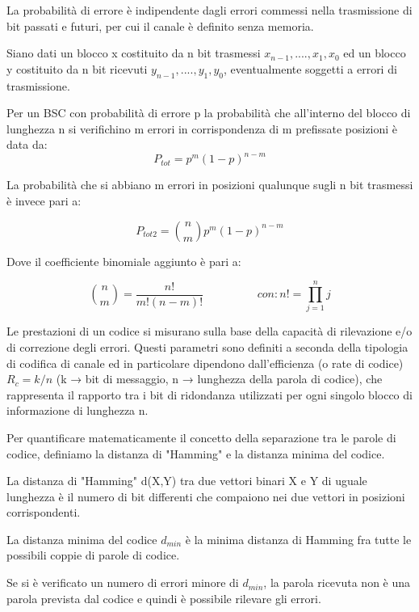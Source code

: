 \documentclass[LaM,binding=0.6cm,oneside]{../sapthesis}
\begin{document}
La probabilità di errore è indipendente dagli errori commessi nella trasmissione di bit passati e futuri, per cui il canale è definito senza memoria.

Siano dati un blocco x costituito da n bit trasmessi $x_{n-1},....,x_1,x_0$ ed un blocco y costituito da n bit ricevuti $y_{n-1},....,y_1,y_0$, eventualmente soggetti a errori di trasmissione.

Per un BSC con probabilità di errore p la probabilità che all'interno del blocco di lunghezza n si verifichino m errori in corrispondenza di m prefissate posizioni è data da:
\begin{equation}
    P_{tot} = p^{m} (1-p)^{n-m}
\end{equation}

La probabilità che si abbiano m errori in posizioni qualunque sugli n bit trasmessi  è invece pari a:

\begin{equation}
    P_{tot2} = \binom{n}{m} p^{m} (1-p)^{n-m}
\end{equation}

Dove il coefficiente binomiale aggiunto è pari a:

\begin{equation}
    \binom{n}{m} = \frac{n!}{m! (n-m)!}  \hspace{2cm} con: n! = \prod_{j=1}^{n}j
\end{equation}


Le  prestazioni  di  un  codice  si  misurano  sulla  base  della
capacità di rilevazione e/o di correzione degli errori. Questi parametri sono definiti a seconda della tipologia di codifica di canale ed in particolare dipendono dall’efficienza (o rate di codice) $R_c=k/n$ (k → bit di messaggio, n → lunghezza
della parola di codice), che rappresenta il rapporto tra i bit di ridondanza utilizzati per ogni singolo blocco di informazione di lunghezza n.

Per  quantificare  matematicamente  il  concetto  della  separazione
tra  le  parole  di  codice,  definiamo  la  distanza  di  "Hamming"  e  la distanza minima del codice.

La distanza  di  "Hamming" d(X,Y)  tra  due  vettori  binari  X  e  Y  di
uguale  lunghezza  è  il  numero  di  bit  differenti  che  compaiono  nei due vettori in posizioni corrispondenti.

La distanza minima del codice $d_{min}$ è la minima distanza di
Hamming fra tutte le possibili coppie di parole di codice.


Se  si  è  verificato  un  numero  di  errori  minore  di  $d_{min}$,  la  parola
ricevuta non è una parola prevista dal codice e quindi è possibile
rilevare gli errori.
\end{document}
